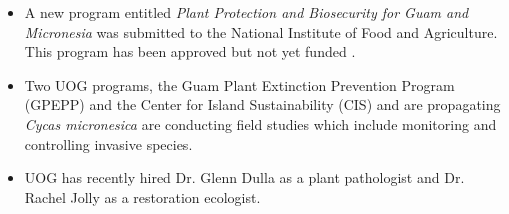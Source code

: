 \documentclass[twocolumn]{scrartcl}
\begin{document}
\begin{itemize}
	\item A new program entitled \textit{Plant Protection and Biosecurity for Guam and Micronesia} was submitted to the National Institute of Food and Agriculture. This program has been approved but not yet funded \cite{NIFA2022}.

	\item Two UOG programs, the Guam Plant Extinction Prevention Program (GPEPP) and the Center for Island Sustainability (CIS) and are propagating \textit{Cycas micronesica} are conducting field studies which include monitoring and controlling invasive species. 
	
	\item UOG has recently hired Dr. Glenn Dulla as a plant pathologist and Dr. Rachel Jolly as a restoration ecologist.
\end{itemize}


\clearpage
\printbibliography
\end{document}
